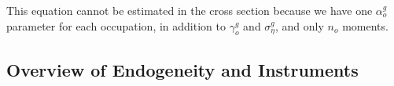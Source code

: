 \documentclass[11pt]{article}
\begin{document}
This equation cannot be estimated in the cross section because we have one $\alpha^g_o$ parameter for each occupation, in addition to $\gamma^g_o$ and $\sigma^g_{\eta}$, and only $n_o$ moments.


%
%
%
%
%



\subsection{Overview of Endogeneity and Instruments}
\end{document}
